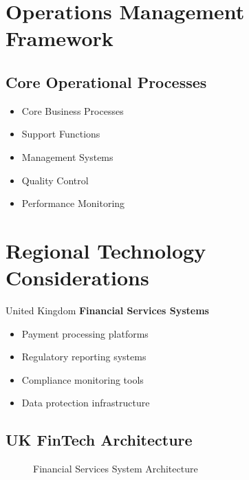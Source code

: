 \section{Operations Management Framework}

\subsection{Core Operational Processes}
\begin{tcolorbox}[colback=white,colframe=primarydark,title=\textbf{Process Categories}]
\begin{itemize}
    \item Core Business Processes
    \item Support Functions
    \item Management Systems
    \item Quality Control
    \item Performance Monitoring
\end{itemize}
\end{tcolorbox}

\FloatBarrier
\section{Regional Technology Considerations}

\begin{regionalbox}{United Kingdom}
\textbf{Financial Services Systems}
\begin{itemize}
    \item Payment processing platforms
    \item Regulatory reporting systems
    \item Compliance monitoring tools
    \item Data protection infrastructure
\end{itemize}
\end{regionalbox}

\subsection{UK FinTech Architecture}
\begin{figure}[htbp]
    \centering
    \caption{Financial Services System Architecture}
    \label{fig:fintech-arch}
\end{figure}

